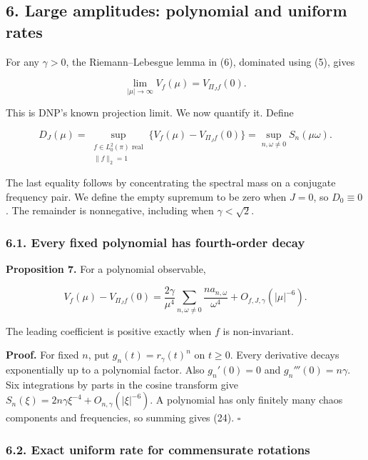 \documentclass[
  british,
  11pt,
  a4paper,
]{article}
\begin{document}
\subsection{6. Large amplitudes: polynomial and uniform
rates}\label{large-amplitudes-polynomial-and-uniform-rates}

For any \(\gamma>0\), the Riemann--Lebesgue lemma in (6), dominated
using (5), gives

\[
\lim_{|\mu|\to\infty}V_f(\mu)=V_{\Pi_Jf}(0). \tag{22}
\]

This is DNP's known projection limit. We now quantify it. Define

\[
D_J(\mu)=\sup_{\substack{f\in L^2_0(\pi)\text{ real}\\\|f\|_2=1}}
\{V_f(\mu)-V_{\Pi_Jf}(0)\}
=\sup_{n,\omega\ne0}S_n(\mu\omega). \tag{23}
\]

The last equality follows by concentrating the spectral mass on a
conjugate frequency pair. We define the empty supremum to be zero when
\(J=0\), so \(D_0\equiv0\). The remainder is nonnegative, including when
\(\gamma<\sqrt2\).

\subsubsection{6.1. Every fixed polynomial has fourth-order
decay}\label{every-fixed-polynomial-has-fourth-order-decay}

\textbf{Proposition 7.} For a polynomial observable,

\[
V_f(\mu)-V_{\Pi_Jf}(0)
=\frac{2\gamma}{\mu^4}
\sum_{n,\omega\ne0}\frac{n a_{n,\omega}}{\omega^4}
+O_{f,J,\gamma}(|\mu|^{-6}). \tag{24}
\]

The leading coefficient is positive exactly when \(f\) is non-invariant.

\textbf{Proof.} For fixed \(n\), put \(g_n(t)=r_\gamma(t)^n\) on
\(t\ge0\). Every derivative decays exponentially up to a polynomial
factor. Also \(g_n'(0)=0\) and \(g_n'''(0)=n\gamma\). Six integrations
by parts in the cosine transform give
\(S_n(\xi)=2n\gamma\xi^{-4}+O_{n,\gamma}(|\xi|^{-6})\). A polynomial has
only finitely many chaos components and frequencies, so summing gives
(24). \(\square\)

\subsubsection{6.2. Exact uniform rate for commensurate
rotations}\label{exact-uniform-rate-for-commensurate-rotations}
\end{document}
